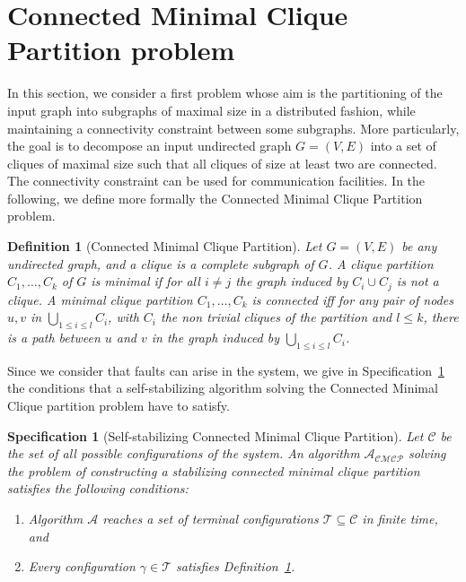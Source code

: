 \documentclass[11pt,letterpaper,onecolumn]{article}
\newtheorem{definition}{Definition}
\newtheorem{spec}{Specification}
\begin{document}
\section{Connected Minimal Clique Partition problem}
\label{sec:cmcp}

In this section, we consider a first problem whose aim is the partitioning of the input graph into subgraphs of maximal size in a distributed fashion, while maintaining a connectivity constraint between some subgraphs. More particularly, the goal is to decompose an input undirected graph $G=(V,E)$ into a set of cliques of maximal size such that all cliques of size at least two are connected. The connectivity constraint can be used for communication facilities. In the following, we define more formally the Connected Minimal Clique Partition problem.

\begin{definition}[Connected Minimal Clique Partition]
\label{def:cmcp}
Let $G=(V,E)$ be any undirected graph, and a \emph{clique} is a complete subgraph of $G$. A clique partition $C_1, \dots, C_k$ of $G$ is \emph{minimal} if for all $i\neq j$ the graph induced by $C_i \cup C_j$ is not a clique. A minimal clique partition $C_1, \dots, C_k$ is \emph{connected} iff for any pair of nodes $u,v$ in $\bigcup_{1 \leq i \leq l} C_i$, with $C_i$ the non trivial cliques of the partition and $l \leq k$, there is a path between $u$ and $v$ in the graph induced by $\bigcup_{1 \leq i \leq l} C_i$.
\end{definition}

Since we consider that faults can arise in the system, we give in Specification~\ref{spec:cmcp} the conditions that a self-stabilizing algorithm solving the Connected Minimal Clique partition problem have to satisfy.

\begin{spec}[Self-stabilizing Connected Minimal Clique Partition]
\label{spec:cmcp}
Let $\mathcal{C}$ be the set of all possible configurations of the system. An algorithm $\mathcal{A_{CMCP}}$ solving the problem of constructing a stabilizing connected minimal clique partition satisfies the following conditions:
\begin{enumerate}
\item Algorithm $\mathcal{A}$ reaches a set of terminal configurations $\mathcal{T} \subseteq \mathcal{C}$ in finite time, and
\item Every configuration $\gamma \in \mathcal{T}$ satisfies Definition~\ref{def:cmcp}.
\end{enumerate}
\end{spec}
\end{document}
